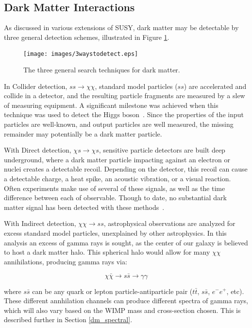   \subsection{Dark Matter Interactions}
    As discussed in various extensions of SUSY, dark matter may be detectable by three general detection schemes, illustrated in Figure \ref{fig:3_searches}.

    \begin{figure}[ht]
      \centering
      \texttt{[image: images/3waystodetect.eps]}
      \caption[3 Search Techniques]{
        The three general search techniques for dark matter.}
      \label{fig:3_searches}
    \end{figure}

    In Collider detection, $ss \rightarrow \chi\chi$, standard model particles ($ss$) are accelerated and collide in a detector, and the resulting particle fragments are measured by a slew of measuring equipment.
    A significant milestone was achieved when this technique was used to detect the Higgs boson~\cite{Higgs_ATLAS,Higgs_CMS}.
    Since the properties of the input particles are well-known, and output particles are well measured, the missing remainder may potentially be a dark matter particle.

    With Direct detection, $\chi s \rightarrow \chi s$, sensitive particle detectors are built deep underground, where a dark matter particle impacting against an electron or nuclei creates a detectable recoil.
    Depending on the detector, this recoil can cause a detectable charge, a heat spike, an acoustic vibration, or a visual reaction.
    Often experiments make use of several of these signals, as well as the time difference between each of observable.
    Though to date, no substantial dark matter signal has been detected with these methods~\cite{direct_dm_detection}.

    With Indirect detection, $\chi\chi \rightarrow ss$, astrophysical observations are analyzed for excess standard model particles, unexplained by other astrophysics.
    In this analysis an excess of gamma rays is sought, as the center of our galaxy is believed to host a dark matter halo.
    This spherical halo would allow for many $\chi\chi$ annihilations, producing gamma rays via: 

    $$\chi\bar{\chi} \rightarrow s\bar{s} \rightarrow \gamma\gamma$$

    where $s\bar{s}$ can be any quark or lepton particle-antiparticle pair ($t\bar{t}$, $s\bar{s}$, $e^{-}e^{+}$, etc).
    These different annhilation channels can produce different spectra of gamma rays, which will also vary based on the WIMP mass and cross-section chosen.
    This is described further in Section \ref{dm_spectral}.



